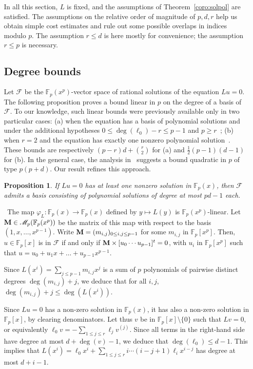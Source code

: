 \documentclass{sig-alternate}
\def\F {\mathbb{F}}
\def\mM {\ensuremath{{\bf M}}}
\def\myproof{\noindent{\sc Proof.}~}
\newtheorem{Prop}{Proposition}
\begin{document}
In all this section, $L$ is fixed, and the assumptions of
Theorem~\ref{coro:solpol} are satisfied. The assumptions on the
relative order of magnitude of $p,d,r$ help us obtain simple cost
estimates and rule out some possible overlaps in indices modulo
$p$. The assumption $r \le d$ is here mostly for convenience; the
assumption $r\le p$ is necessary.



\subsection{Degree bounds}

\noindent 
Let $\mathcal{F}$ be the $\F_p(x^p)$-vector space of rational
solutions of the equation $L u=0$.  The following proposition proves a
bound linear in $p$ on the degree of a basis of $\mathcal{F}$. To our
knowledge, such linear bounds were previously available only in two
particular cases: (a) when the equation has a basis of polynomial
solutions and under the additional hypotheses $0\le \deg(\ell_0) - r
\le p - 1$ and $p \ge r$~\cite[Th.~7]{Honda81}; (b) when $r = 2$ and
the equation has exactly one nonzero polynomial
solution~\cite[Lemma~10.1]{Dwork82}. These bounds are respectively
$(p-r)d+ {r\choose 2}$ for (a) and $\frac12 (p-1)(d-1)$ for (b). In the
general case, the analysis in~\cite{Cluzeau03,Cluzeau04} suggests a
bound quadratic in $p$ of type $p(p + d)$. Our result refines this
approach.

\begin{Prop}\label{theo:theorysolpol}
  If $Lu = 0$ has at least one nonzero solution in $\F_p(x)$, then
  $\mathcal{F}$ admits a basis consisting of polynomial solutions of
  degree at most $pd-1$ each.
\end{Prop}
\myproof The map $\varphi_L: \F_p(x) \to \F_p(x)$ defined by $y
\mapsto L(y)$ is $\F_p(x^p)$-linear. Let $\mM \in
\mathscr{M}_p(\F_p(x^p))$ be the matrix of this map with respect to the basis
$(1, x,\dots, x^{p-1})$.  Write $\mM = (m_{i,j})_{0\le i,j\le
  p-1}$ for some $m_{i,j}$ in $\F_p[x^p]$. Then, $u \in \F_p[x]$ is in
$\mathcal{F}$ if and only if $\mM \times [u_0 \cdots u_{p-1}]^t = 0$,
with $u_i$ in $\F_p[x^p]$ such that $u = u_0 +  u_1x + \dots +
u_{p-1}x^{p-1}$.

Since $L(x^i) = \sum_{j\le p-1} m_{i,j}x^j$ is a sum of $p$
polynomials of pairwise distinct degrees $\deg(m_{i,j})+j$, we deduce
that for all $i,j$, $\deg(m_{i,j})+j \le \deg(L(x^i))$.

Since $Lu=0$ has a non-zero solution in $\F_p(x)$, it has also a
non-zero solution in $\F_p[x]$, by clearing denominators. Let thus $v$
be in $\F_p[x]\setminus\{0\}$ such that $Lv=0$, or equivalently $\ell_0 v =
-\sum_{1 \le j \le r} \ell_j v^{(j)}$. Since all terms in the
right-hand side have degree at most $d+\deg(v)-1$, we deduce that
$\deg(\ell_0) \le d-1$. This implies that $L(x^i)=\ell_0 x^i + 
\sum_{1 \le j \le r} i\cdots(i-j+1) \ell_i x^{i-j}$ has degree
at most $d+i-1$.
\end{document}
